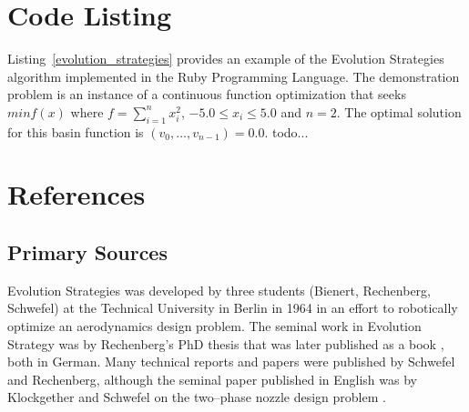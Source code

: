 \documentclass[a4paper, 11pt]{article}
\begin{document}
\section{Code Listing}
\label{sec:code}
Listing~\ref{evolution_strategies} provides an example of the Evolution Strategies algorithm implemented in the Ruby Programming Language.
The demonstration problem is an instance of a continuous function optimization that seeks $min f(x)$ where $f=\sum_{i=1}^n x_{i}^2$, $-5.0\leq x_i \leq 5.0$ and $n=2$. The optimal solution for this basin function is $(v_0,\ldots,v_{n-1})=0.0$.
todo...




\section{References}
\label{sec:references}

% 
% 
\subsection{Primary Sources}
Evolution Strategies was developed by three students (Bienert, Rechenberg, Schwefel) at the Technical University in Berlin in 1964 in an effort to robotically optimize an aerodynamics design problem.
The seminal work in Evolution Strategy was by Rechenberg's PhD thesis  \cite{Rechenberg1971} that was later published as a book \cite{Rechenberg1973}, both in German.
Many technical reports and papers were published by Schwefel and Rechenberg, although the seminal paper published in English was by Klockgether and Schwefel on the two--phase nozzle design problem \cite{Klockgether1970}.
\end{document}
